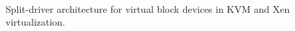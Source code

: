 \begin{figure}[t]
   \centering
    ~~~~~~~~~~~~~~~
   \caption{Split-driver architecture for virtual block devices in KVM and Xen virtualization.}
   \label{fig:disk-io-arch}
\end{figure}

